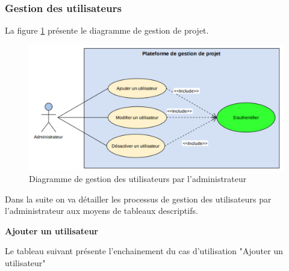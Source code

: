 \subsubsection{	Gestion des utilisateurs}
La figure \ref{fig:cas_gerutil} présente le diagramme de gestion de projet.
\begin{figure}[h]
    \centering
    \includegraphics[scale=1]{figures/anis10.png}
    \caption{Diagramme de gestion des utilisateurs par l’administrateur}
    \label{fig:cas_gerutil}
\end{figure}
\par Dans la suite on va détailler les processus de gestion des utilisateurs par l’administrateur aux moyens de tableaux descriptifs.\newpage
\par \textbf{ 	Ajouter un utilisateur}
\par Le tableau suivant présente l’enchainement du cas d’utilisation "Ajouter un utilisateur"
